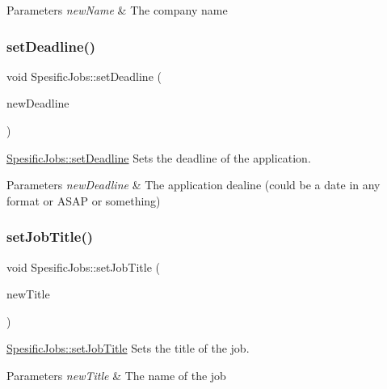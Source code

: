 \begin{DoxyParams}{Parameters}
{\em new\+Name} & The company name \\
\hline
\end{DoxyParams}
\mbox{\label{class_spesific_jobs_a80ceb9ead40dc83e0adcf6ed2b3d5465}} 
\subsubsection{\texorpdfstring{set\+Deadline()}{setDeadline()}}
{\footnotesize\ttfamily void Spesific\+Jobs\+::set\+Deadline (\begin{DoxyParamCaption}\item[{Q\+String}]{new\+Deadline }\end{DoxyParamCaption})}



\hyperlink{class_spesific_jobs_a80ceb9ead40dc83e0adcf6ed2b3d5465}{Spesific\+Jobs\+::set\+Deadline} Sets the deadline of the application. 


\begin{DoxyParams}{Parameters}
{\em new\+Deadline} & The application dealine (could be a date in any format or \textquotesingle{}A\+S\+AP\textquotesingle{} or something) \\
\hline
\end{DoxyParams}
\mbox{\label{class_spesific_jobs_abb4d8e45e0a2be8197ef03057fc5c714}} 
\subsubsection{\texorpdfstring{set\+Job\+Title()}{setJobTitle()}}
{\footnotesize\ttfamily void Spesific\+Jobs\+::set\+Job\+Title (\begin{DoxyParamCaption}\item[{Q\+String}]{new\+Title }\end{DoxyParamCaption})}



\hyperlink{class_spesific_jobs_abb4d8e45e0a2be8197ef03057fc5c714}{Spesific\+Jobs\+::set\+Job\+Title} Sets the title of the job. 


\begin{DoxyParams}{Parameters}
{\em new\+Title} & The name of the job \\
\hline
\end{DoxyParams}
\mbox{\label{class_spesific_jobs_a39df1f364b1ca8e3059094708f01983c}} 
